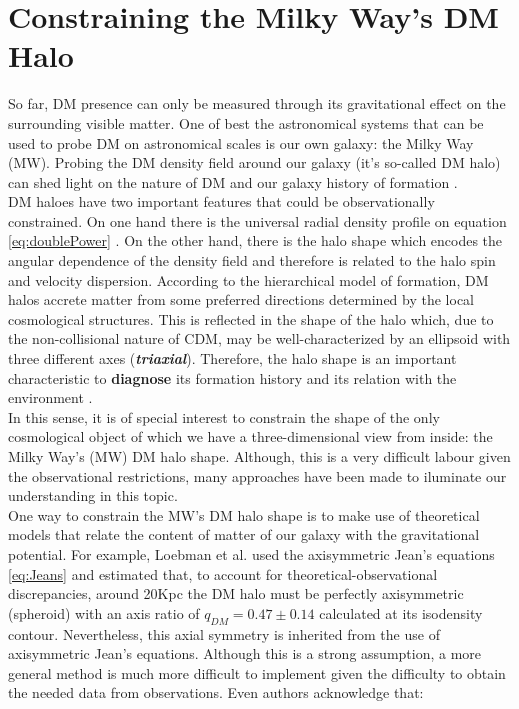 \section{Constraining the Milky Way's DM Halo}
So far, DM presence can only be measured through its gravitational effect on the surrounding visible matter. 
One of best the astronomical systems that can be used to probe DM on astronomical scales is our own galaxy: the Milky Way (MW).
Probing the DM density field around our galaxy (it's so-called DM halo) can shed light on the nature of DM \cite{Read_and_Moore_2005,Nipoti_et_al._2007} and our
galaxy history of formation \cite{Read_et_al._2008,Read_et_al._2009,Vera-Ciro_et_al._2011}.\\

DM haloes have two important features that could be observationally constrained. 
On one hand there is the universal radial density profile on equation \eqref{eq:doublePower} \cite{Navarro_et_al._2010}. 
On the other hand, there is the halo shape which encodes the angular dependence of the density field and therefore is related to the halo spin and velocity dispersion. 
According to the hierarchical model of formation, DM halos accrete matter from some preferred directions determined by the local cosmological structures. This is reflected in the shape of the halo which, due to the non-collisional nature of CDM, may be well-characterized by an ellipsoid with three different axes (\textbf{\textit{triaxial}}). Therefore, the halo shape is an important characteristic to \textbf{diagnose} its formation history and its relation with the environment \cite{Bardeen_1986,Vera-Ciro_and_Helmi_2013}.\\

In this sense, it is of special interest to constrain the shape of the only cosmological object of which we have a three-dimensional view from inside: the Milky Way's (MW) DM halo shape. Although, this is a very difficult labour given the observational restrictions, many approaches have been made to iluminate our understanding in this topic. \\

One way to constrain the MW's DM halo shape is to make use of theoretical models that relate the content of matter of our galaxy with the gravitational potential. For example, Loebman et al. \cite{Loebman_et_al._2012} used the axisymmetric Jean's equations \eqref{eq:Jeans} and estimated that, to account for theoretical-observational discrepancies, around 20Kpc the DM halo must be perfectly axisymmetric (spheroid) with an axis ratio of $q_{DM}=0.47 \pm 0.14$ calculated at its isodensity contour. Nevertheless, this axial symmetry is inherited from the use of axisymmetric Jean's equations. 
Although this is a strong assumption, a more general method is much more difficult to implement given the difficulty to obtain the needed data from observations. 
Even authors acknowledge that:

